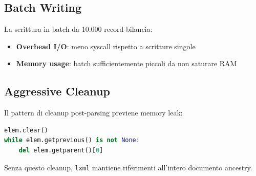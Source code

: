 \subsection{Batch Writing}

La scrittura in batch da 10.000 record bilancia:
\begin{itemize}
    \item \textbf{Overhead I/O}: meno syscall rispetto a scritture singole
    \item \textbf{Memory usage}: batch sufficientemente piccoli da non saturare RAM
\end{itemize}

\subsection{Aggressive Cleanup}

Il pattern di cleanup post-parsing previene memory leak:

\begin{lstlisting}[language=Python]
elem.clear()
while elem.getprevious() is not None:
    del elem.getparent()[0]
\end{lstlisting}

Senza questo cleanup, \texttt{lxml} mantiene riferimenti all'intero documento ancestry.
